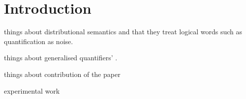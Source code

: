\section{Introduction}


things about distributional semantics and that they treat logical words such as quantification as noise. 

things about generalised quantifiers'  \cite{BarwiseCooper81}.

things about contribution of the paper

experimental work \cite{BaroniZam} 

